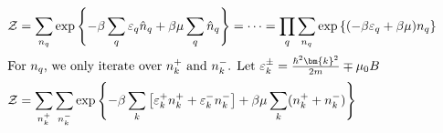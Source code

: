 \documentclass{article}
\begin{document}
\begin{enumerate}
		\begin{align}
			\mathcal{Z} &= \sum_{n_q} \exp\left\{ -\beta \sum_{q} \varepsilon_q \hat{n}_q + \beta\mu \sum_{q} \hat{n}_q \right\} = \cdots = \prod_{q} \sum_{n_q} \exp \left\{ (-\beta \varepsilon_q + \beta\mu)n_q \right\} \\
			\intertext{For $n_q$, we only iterate over $n^+_k$ and $n^-_k$. Let $\varepsilon_k^{\pm} = \frac{\hbar^2 \bm{k}^2}{2m} \mp \mu_0 B$}
			\mathcal{Z} &= \sum_{n^+_k} \sum_{n^-_k} \exp\left\{ -\beta \sum_{k} \left[ \varepsilon_k^+ n_k^+ + \varepsilon_k^- n_k^- \right] + \beta \mu \sum_{k} (n_k^+ + n_k^-)  \right\} \\

\end{align}
\end{enumerate}
\end{document}
